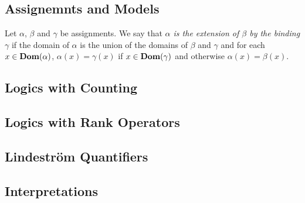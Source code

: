 \documentclass[../main/thesis.tex]{subfiles}
\begin{document}
\subsection{Assignemnts and Models}


Let $\alpha$, $\beta$ and $\gamma$ be assignments. We say that \emph{$\alpha$ is
  the extension of $\beta$ by the binding $\gamma$} if the domain of $\alpha$ is
the union of the domains of $\beta$ and $\gamma$ and for each $x \in
\text{\textbf{Dom}}(\alpha)$, $\alpha (x) = \gamma(x)$ if $x \in \text{\textbf{Dom}}(\gamma)$ and otherwise
$\alpha (x) = \beta(x)$.

\subsection{Logics with Counting}
\subsection{Logics with Rank Operators}
\subsection{Lindestr\"{o}m Quantifiers}
\subsection{Interpretations}
\end{document}
